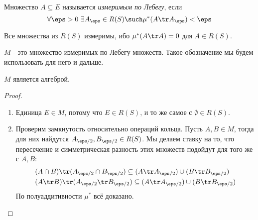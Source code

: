 \begin{definition}
	Множество $A \subseteq E$ называется \textit{измеримым по Лебегу}, если
	\[
		\forall \eps > 0\ \exists A_\eps \in R(S) \such \mu^*(A \tr A_\eps) < \eps
	\]
\end{definition}

\begin{note}
	Все множества из $R(S)$ измеримы, ибо $\mu^*(A \tr A) = 0$ для $A \in R(S)$.
\end{note}

\begin{note}
	$M$ - это множество измеримых по Лебегу множеств. Такое обозначение мы будем использовать для него и дальше.
\end{note}

\begin{theorem}
	$M$ является алгеброй.
\end{theorem}

\begin{proof}~
	\begin{enumerate}
		\item Единица $E \in M$, потому что $E \in R(S)$, и то же самое с $\emptyset \in R(S)$.
		
		\item Проверим замкнутость относительно операций кольца. Пусть $A, B \in M$, тогда для них найдутся $A_{\eps / 2}, B_{\eps / 2} \in R(S)$. Мы делаем ставку на то, что пересечение и симметрическая разность этих множеств подойдут для того же с $A, B$:
		\begin{align*}
			&{(A \cap B) \tr (A_{\eps / 2} \cap B_{\eps / 2}) \subseteq (A \tr A_{\eps / 2}) \cup (B \tr B_{\eps / 2})}
			\\
			&{(A \tr B) \tr (A_{\eps / 2} \tr B_{\eps / 2}) \subseteq (A \tr A_{\eps / 2}) \cup (B \tr B_{\eps / 2})}
		\end{align*}
		По полуаддитивности $\mu^*$ всё доказано.
	\end{enumerate}
\end{proof}

